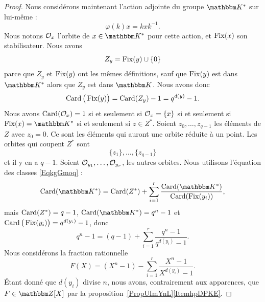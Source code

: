 \begin{proof}
    Nous considérons maintenant l'action adjointe du groupe \( \eK^*\) sur lui-même :
    \begin{equation}
        \varphi(k)x=kxk^{-1}.
    \end{equation}
    Nous notons \( \mathcal{O}_x\) l'orbite de \( x\in \eK^*\) pour cette action, et \( \operatorname{Fix}(x)\) son stabilisateur. Nous avons
    \begin{equation}
        Z_y=\operatorname{Fix}(y)\cup\{ 0 \}
    \end{equation}
    parce que \( Z_y\) et \( \operatorname{Fix}(y)\) ont les mêmes définitions, sauf que \( \operatorname{Fix}(y)\) est dans \( \eK^*\) alors que \( Z_y\) est dans \( \eK\). Nous avons donc
    \begin{equation}
        \operatorname{Card}\big( \operatorname{Fix}(y) \big)=\operatorname{Card}(Z_y)-1=q^{d(y)}-1.
    \end{equation}
    Nous avons \( \operatorname{Card}(\mathcal{O}_x)=1\) si et seulement si \( \mathcal{O}_x=\{ x \}\) si et seulement si \( \Fix(x)=\eK^*\) si et seulement si \( z\in Z^*\). Soient \( z_0,\ldots, z_{q-1}\) les éléments de \( Z\) avec \( z_0=0\). Ce sont les éléments qui auront une orbite réduite à un point. Les orbites qui coupent \( Z^*\) sont
    \begin{equation}
        \{ z_1 \},\ldots, \{ z_{q-1} \}
    \end{equation}
    et il y en a \( q-1\). Soient \( \mathcal{O}_{y_1},\ldots, \mathcal{O}_{y_r}\), les autres orbites. Nous utilisons l'équation des classes \eqref{EqkgGmoq} :
    \begin{equation}
        \Card(\eK^*)=\Card(Z^*)+\sum_{i=1}^{r}\frac{ \Card(\eK^*) }{ \Card(\Fix(y_i)) },
    \end{equation}
    mais \( \operatorname{Card}(Z^*)=q-1\), \( \Card(\eK^*)=q^n-1\) et \( \operatorname{Card}\big( \operatorname{Fix}(y_i) \big)=q^{d(y_i)}-1\), donc
    \begin{equation}        \label{EqBPBDzE}
        q^n-1=(q-1)+\sum_{i=1}^{r}\frac{ q^n-1 }{ q^{d(y_i)}-1 }.
    \end{equation}
    Nous considérons la fraction rationnelle
    \begin{equation}        \label{EqATGciu}
        F(X)=(X^n-1)-\sum_{i=1}^{r}\frac{ X^n-1 }{ X^{d(y_i)}-1 }.
    \end{equation}
    Étant donné que \( d(y_i)\) divise \( n\), nous avons, contrairement aux apparences, que \( F\in \eZ[X]\) par la proposition~\ref{PropUImYnL}\ref{ItemhpDPKE}.


\end{proof}
